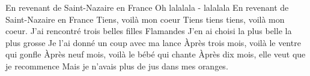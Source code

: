 \beginverse*
En revenant de Saint-Nazaire en France
Oh lalalala - lalalala
En revenant de Saint-Nazaire en France
Tiens, voilà mon coeur
Tiens tiens tiens, voilà mon coeur.
\endverse
\beginverse*
J’ai rencontré trois belles filles Flamandes
J’en ai choisi la plus belle la plus grosse
Je l’ai donné un coup avec ma lance
Àprès trois mois, voilà le ventre qui gonfle
Àprès neuf mois, voilà le bébé qui chante
Àprès dix mois, elle veut que je recommence
Mais je n’avais plus de jus dans mes oranges. 
\endverse
\endsong